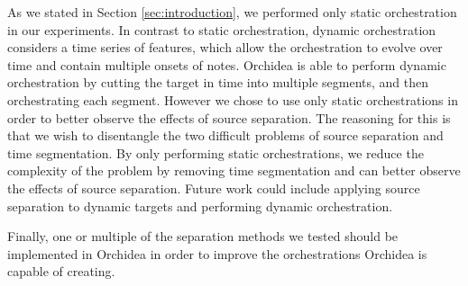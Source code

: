 \documentclass{article}
\begin{document}
    As we stated in Section \ref{sec:introduction}, we performed only static orchestration in our experiments. In contrast to static orchestration, dynamic orchestration considers a time series of features, which allow the orchestration to evolve over time and contain multiple onsets of notes. Orchidea is able to perform dynamic orchestration by cutting the target in time into multiple segments, and then orchestrating each segment. However we chose to use only static orchestrations in order to better observe the effects of source separation. The reasoning for this is that we wish to disentangle the two difficult problems of source separation and time segmentation. By only performing static orchestrations, we reduce the complexity of the problem by removing time segmentation and can better observe the effects of source separation. Future work could include applying source separation to dynamic targets and performing dynamic orchestration.
    
    Finally, one or multiple of the separation methods we tested should be implemented in Orchidea in order to improve the orchestrations Orchidea is capable of creating. 



\end{document}
